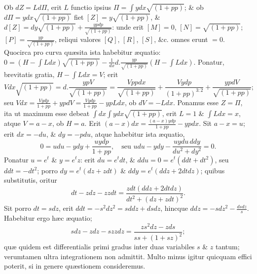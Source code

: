 Ob $dZ=Ld\Pi$, erit $L$ functio ipsius $\Pi=\int ydx\sqrt{(1+pp)}$; \& ob $d\Pi=ydx\sqrt{(1+pp)}$ fiet $[Z]=y\sqrt{(1+pp)}$, \& $d[Z]=dy\sqrt{(1+pp)}+\frac{ypdp}{\sqrt{(1+pp)}}$: unde erit $[M]=0$, $[N]=\sqrt{(1+pp)}$; $[P]=\frac{yp}{\sqrt{(1+pp)}}$, reliqui valores $[Q]$, $[R]$, $[S]$, \&c. omnes erunt $=0$. Quocirca pro curva quæsita ista habebitur æquatio: $0=(H-\int Ldx)\sqrt{(1+pp)}-\frac1{dx}d.\frac{yp}{\sqrt{(1+pp)}}(H-\int Ldx)$. Ponatur, brevitatis gratia, $H-\int Ldx=V$; erit
\[Vdx\sqrt{(1+pp)}=d.\frac{ypV}{\sqrt{(1+pp)}}=\frac{Vppdx}{\sqrt{(1+pp)}}+\frac{Vydp}{(1+pp)^{3:2}}+\frac{ypdV}{\sqrt{(1+pp)}};\]
seu $Vdx=\frac{Vydp}{1+pp}+ypdV=\frac{Vydp}{1+pp}-ypLdx$, ob $dV=-Ldx$. Ponamus esse $Z=\Pi$, ita ut maximum esse debeat $\int dx\int ydx\sqrt{(1+pp)}$, erit $L=1$ \& $\int Ldx=x$, atque $V=a-x$, ob $H=a$. Erit $(a-x)dx=\frac{(a-x)ydp}{1+pp}-ypdx$. Sit $a-x=u$; erit $dx=-du$, \& $dy=-pdu$, atque habebitur ista æquatio,
\[0=udu-ydy+\frac{uydp}{1+pp},\quad\text{seu }udu-ydy-\frac{uydu\,ddy}{du^2+dy^2}=0.\]
Ponatur $u=e^t$ \& $y=e^tz$: erit $du=e^tdt$, \& $ddu=0=e^t(ddt+dt^2)$, seu $ddt=-dt^2$; porro $dy=e^t(dz+zdt)$ \& $ddy=e^t(ddz+2dtdz)$; quibus substitutis, oritur
\[dt-zdz-zzdt=\frac{zdt(ddz+2dtdz)}{dt^2+(dz+zdt)^2}.\]
Sit porro $dt=sdz$, erit $ddt=-s^2dz^2=sddz+dsdz$, hincque $ddz=-sdz^2-\frac{dsdz}{s}$. Habebitur ergo hæc æquatio;
\[sdz-zdz-szzdz=\frac{zs^2dz-zds}{ss+(1+sz)^2};\]
quæ quidem est differentialis primi gradus inter duas variabiles $s$ \& $z$ tantum; verumtamen ultra integrationem non admittit. Multo minus igitur quicquam effici poterit, si in genere quæstionem consideremus.
